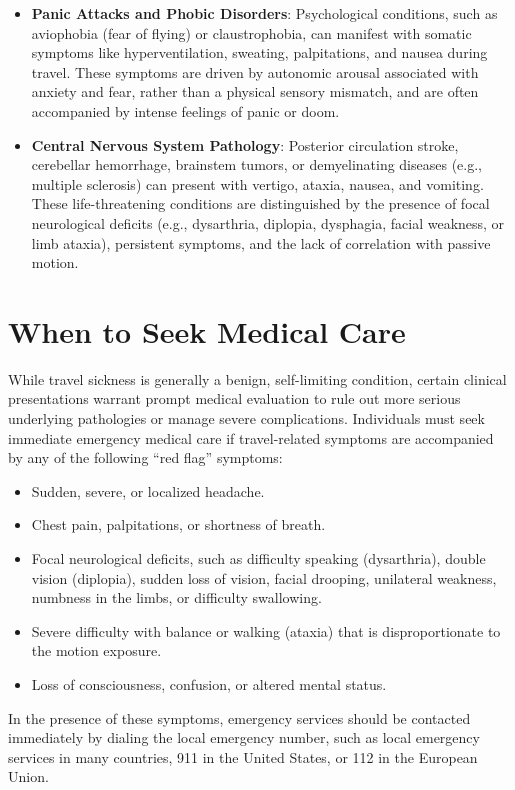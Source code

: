 \begin{itemize}
    \item \textbf{Panic Attacks and Phobic Disorders}: Psychological conditions, such as aviophobia (fear of flying) or claustrophobia, can manifest with somatic symptoms like hyperventilation, sweating, palpitations, and nausea during travel. These symptoms are driven by autonomic arousal associated with anxiety and fear, rather than a physical sensory mismatch, and are often accompanied by intense feelings of panic or doom.
    \item \textbf{Central Nervous System Pathology}: Posterior circulation stroke, cerebellar hemorrhage, brainstem tumors, or demyelinating diseases (e.g., multiple sclerosis) can present with vertigo, ataxia, nausea, and vomiting. These life-threatening conditions are distinguished by the presence of focal neurological deficits (e.g., dysarthria, diplopia, dysphagia, facial weakness, or limb ataxia), persistent symptoms, and the lack of correlation with passive motion.
\end{itemize}

\section*{When to Seek Medical Care}
While travel sickness is generally a benign, self-limiting condition, certain clinical presentations warrant prompt medical evaluation to rule out more serious underlying pathologies or manage severe complications.
Individuals must seek immediate emergency medical care if travel-related symptoms are accompanied by any of the following ``red flag'' symptoms:
\begin{itemize}
    \item Sudden, severe, or localized headache.
    \item Chest pain, palpitations, or shortness of breath.
    \item Focal neurological deficits, such as difficulty speaking (dysarthria), double vision (diplopia), sudden loss of vision, facial drooping, unilateral weakness, numbness in the limbs, or difficulty swallowing.
    \item Severe difficulty with balance or walking (ataxia) that is disproportionate to the motion exposure.
    \item Loss of consciousness, confusion, or altered mental status.
\end{itemize}
In the presence of these symptoms, emergency services should be contacted immediately by dialing the local emergency number, such as local emergency services in many countries, 911 in the United States, or 112 in the European Union.

